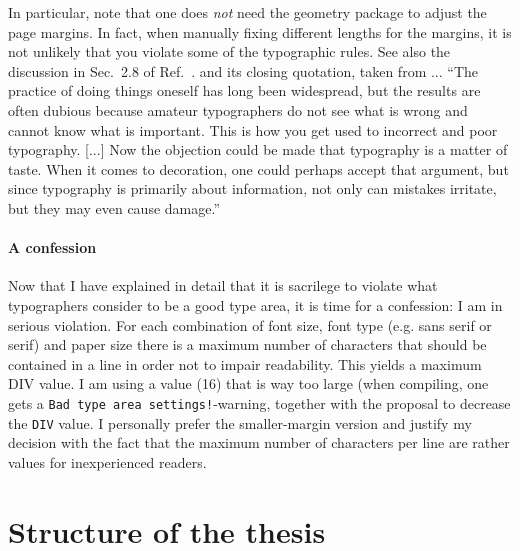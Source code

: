 In particular, note that one does \emph{not} need the geometry package to adjust the page margins. In fact, when manually fixing different lengths for the margins, it is not unlikely that you violate some of the typographic rules. See also the discussion in Sec.~2.8 of Ref.~. and its closing quotation, taken from ... ``The practice of doing things oneself has long been widespread, but the results are often dubious because amateur typographers do not see what is wrong and cannot know what is important. This is how you get used to incorrect and poor typography. [...] Now the objection could be made that typography is a matter of taste. When it comes to decoration, one could perhaps accept that argument, but since typography is primarily about information, not only can mistakes irritate, but they may even cause damage.''

\paragraph{A confession} Now that I have explained in detail that it is sacrilege to violate what typographers consider to be a good type area, it is time for a confession: I am in serious violation. 
For each combination of font size, font type (e.g. sans serif or serif) and paper size there is a maximum number of characters that should be contained in a line in order not to impair readability. This yields a maximum DIV value. I am using a value (16) that is way too large (when compiling, one gets a \verb|Bad type area settings!|-warning, together with the proposal to decrease the \verb|DIV| value. I personally prefer the smaller-margin version and justify my decision with the fact that the maximum number of characters per line are rather values for inexperienced readers.


\section{Structure of the thesis}

